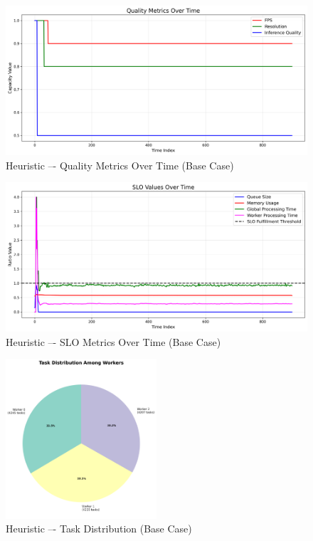 \begin{figure}[h]
    \centering
    \includegraphics[width=\textwidth]{img/results/basic/heuristic_quality_metrics.png}
    \caption{Heuristic –- Quality Metrics Over Time (Base Case)}
\end{figure}
\begin{figure}[h]
    \centering
    \includegraphics[width=\textwidth]{img/results/basic/heuristic_slo_values.png}
    \caption{Heuristic –- SLO Metrics Over Time (Base Case)}
\end{figure}
\begin{figure}[h]
    \centering
    \includegraphics[width=0.5\textwidth]{img/results/basic/heuristic_task_distribution_pie.png}
    \caption{Heuristic –- Task Distribution (Base Case)}
\end{figure}

